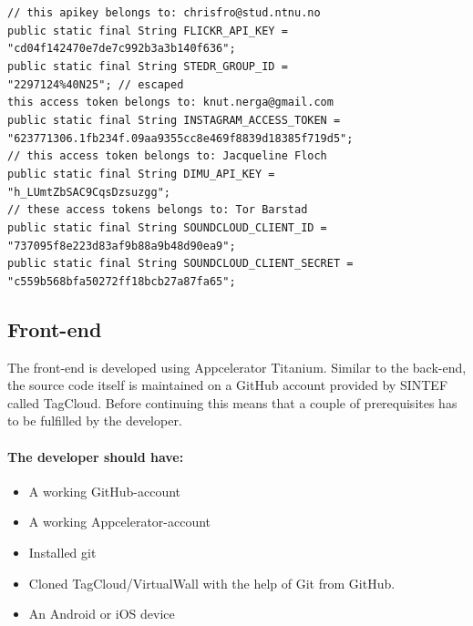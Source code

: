 \texttt{// this apikey belongs to: chrisfro@stud.ntnu.no} \\
\texttt{public static final String FLICKR\_API\_KEY = } \\
\hspace*{4em}\texttt{"cd04f142470e7de7c992b3a3b140f636";} \\
\texttt{public static final String STEDR\_GROUP\_ID =} \\ 
\hspace*{4em}\texttt{"2297124\%40N25"; // escaped} \\
\texttt{this access token belongs to: knut.nerga@gmail.com} \\
\texttt{public static final String INSTAGRAM\_ACCESS\_TOKEN =} \\ 
\hspace*{4em}\texttt{"623771306.1fb234f.09aa9355cc8e469f8839d18385f719d5";} \\
\texttt{// this access token belongs to: Jacqueline Floch} \\
\texttt{public static final String DIMU\_API\_KEY =} \\ 
\hspace*{4em}\texttt{"h\_LUmtZbSAC9CqsDzsuzgg";} \\
\texttt{// these access tokens belongs to: Tor Barstad} \\
\texttt{public static final String SOUNDCLOUD\_CLIENT\_ID =} \\ 
\hspace*{4em}\texttt{"737095f8e223d83af9b88a9b48d90ea9";} \\
\texttt{public static final String SOUNDCLOUD\_CLIENT\_SECRET =} \\ 
\hspace*{4em}\texttt{"c559b568bfa50272ff18bcb27a87fa65";} \\

\subsection{Front-end}

The front-end is developed using Appcelerator Titanium.  Similar to the back-end, the source code itself is maintained on a GitHub account provided by SINTEF called TagCloud. Before continuing this means that a couple of prerequisites has to be fulfilled by the developer.

\paragraph{The developer should have:}
\begin{itemize}
\item A working GitHub-account 
\item A working Appcelerator-account 
\item Installed git
\item Cloned TagCloud/VirtualWall with the help of Git from GitHub.
\item An Android or iOS device
\end{itemize}  

